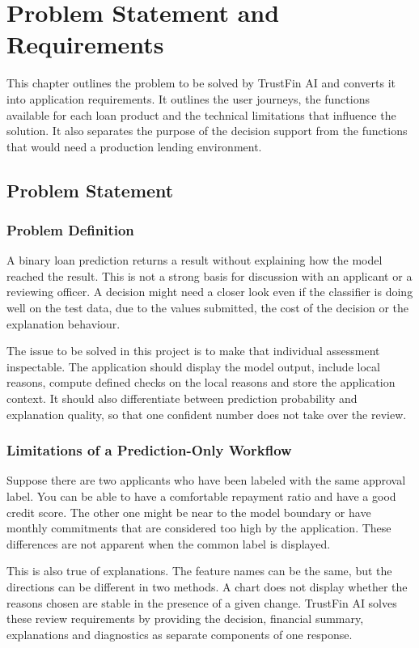 \chapter[PROBLEM STATEMENT AND REQUIREMENTS]{Problem Statement and Requirements}

This chapter outlines the problem to be solved by TrustFin AI and converts it into application requirements. It outlines the user journeys, the functions available for each loan product and the technical limitations that influence the solution. It also separates the purpose of the decision support from the functions that would need a production lending environment.

\section{Problem Statement}
\subsection{Problem Definition}
A binary loan prediction returns a result without explaining how the model reached the result. This is not a strong basis for discussion with an applicant or a reviewing officer. A decision might need a closer look even if the classifier is doing well on the test data, due to the values submitted, the cost of the decision or the explanation behaviour.

The issue to be solved in this project is to make that individual assessment inspectable. The application should display the model output, include local reasons, compute defined checks on the local reasons and store the application context. It should also differentiate between prediction probability and explanation quality, so that one confident number does not take over the review.

\subsection{Limitations of a Prediction-Only Workflow}
Suppose there are two applicants who have been labeled with the same approval label. You can be able to have a comfortable repayment ratio and have a good credit score. The other one might be near to the model boundary or have monthly commitments that are considered too high by the application. These differences are not apparent when the common label is displayed.

This is also true of explanations. The feature names can be the same, but the directions can be different in two methods. A chart does not display whether the reasons chosen are stable in the presence of a given change. TrustFin AI solves these review requirements by providing the decision, financial summary, explanations and diagnostics as separate components of one response.

